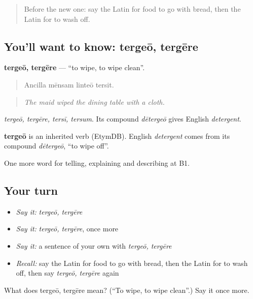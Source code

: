 \label{lesson:LA-C350-tergeo}



\begin{quote}
Before the new one: say the Latin for food to go with bread, then the Latin for to wash off.
\end{quote}

\subsection*{You'll want to know: tergeō, tergēre}
\textbf{tergeō, tergēre} — \textquotedblleft{}to wipe, to wipe clean\textquotedblright{}.

\begin{quote}
Ancilla mēnsam linteō tersit.
\end{quote}

\begin{quote}
\emph{The maid wiped the dining table with a cloth.}
\end{quote}

\emph{tergeō, tergēre, tersī, tersum}. Its compound \emph{dētergeō} gives English \emph{detergent}.

\begin{cousinweb}
\textbf{tergeō} is an inherited verb (EtymDB). English \emph{detergent} comes from its compound \emph{dētergeō}, \textquotedblleft{}to wipe off\textquotedblright{}.
\end{cousinweb}

\begin{grammarlens}[title={What you've built}]
One more word for telling, explaining and describing at B1.
\end{grammarlens}

\subsection*{Your turn}
\begin{itemize}
\raggedright
  \item \emph{Say it:} \emph{tergeō, tergēre}
  \item \emph{Say it:} \emph{tergeō, tergēre}, once more
  \item \emph{Say it:} a sentence of your own with \emph{tergeō, tergēre}
  \item \emph{Recall:} say the Latin for food to go with bread, then the Latin for to wash off, then say \emph{tergeō, tergēre} again
\end{itemize}

\begin{tcolorbox}[breakable,colback=teal!4,colframe=teal!35!black,title={Before you move on}]
What does tergeō, tergēre mean? (\textquotedblleft{}To wipe, to wipe clean\textquotedblright{}.) Say it once more.
\end{tcolorbox}
